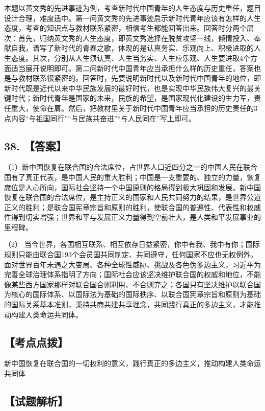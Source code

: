 \documentclass[UTF8,11pt]{ctexart}
\begin{document}
本题以黄文秀的先进事迹为例，考查新时代中国青年的人生态度与历史重任，题目设计合理，难度适中。第一问黄文秀的先进事迹启示新时代青年应该有怎样的人生态度，考查的知识点与教材联系紧密，相信考生都能回答出来。回答时分两个层次：首先，归纳黄文秀的人生态度，即黄文秀选择在脱贫攻坚一线，倾情投入、奉献自我，谱写了新时代的青春之歌，体现的是认真务实、乐观向上、积极进取的人生态度。其次，分别从人生须认真、人生当务实、人生应乐观、人生要进取4个方面适当展开说明即可。第二问新时代中国青年应当承担什么样的历史重任，答案也是与教材联系很紧密的。回答时，先要说明新时代以及新时代中国青年的地位，即新时代既是近代以来中华民族发展的最好时代，也是实现中华民族伟大复兴的最关键时代；新时代青年是国家的未来，民族的希望，是国家现代化建设的生力军，责任重大，使命在肩。然后，把教材里关于新时代中国青年应当承担的历史责任的3点内容“与祖国同行”“与民族共奋进”“与人民同在”写上即可。


\subsection*{38. 【答案】}

（1）新中国恢复在联合国的合法席位，占世界人口近四分之一的中国人民在联合国有了真正代表，是中国人民的重大胜利；中国是一支重要的、独立的力量，恢复席位是人心所向，国际社会坚持一个中国原则的格局得到极大巩固和发展。新中国恢复在联合国的合法席位，是主持正义的国家和人民共同努力的结果，是世界公道正义的胜利；是联合国宪章宗旨和原则的胜利，使联合国的普遍性、代表性和权威性得到切实增强；世界和平与发展正义力量得到空前壮大，是人类和平发展事业的里程碑。


（2） 当今世界，各国相互联系、相互依存日益紧密，你中有我、我中有你；国际规则只能由联合国193个会员国共同制定、共同遵守，任何国家不应也无权例外。面对世界百年未遇之大变局、各种全球性威胁、挑战及各色伪多边主义，习近平为完善全球治理体系指明了方向；国际社会应该坚决维护联合国的权威和地位，不能像某些西方国家那样对联合国合则利用、不合则弃之；各国只有坚决维护以联合国为核心的国际体系、以国际法为基础的国际秩序、以联合国宪章宗旨和原则为基础的国际关系基本准则，秉持共商共建共享理念，共同践行真正的多边主义，才能推动构建人类命运共同体。


\subsection*{【考点点拨】}

新中国恢复在联合国的一切权利的意义，践行真正的多边主义，推动构建人类命运共同体


\subsection*{【试题解析】}
\end{document}
